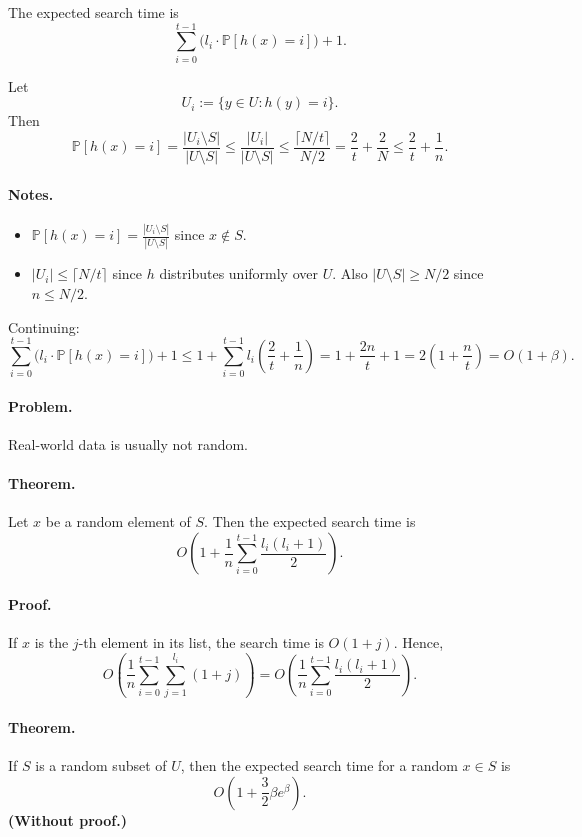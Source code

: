 \documentclass{article}
\begin{document}
The expected search time is
\[
\sum_{i=0}^{t-1} \big( l_i \cdot \mathbb{P}[h(x)=i] \big) + 1.
\]

Let
\[
U_i := \{y\in U : h(y)=i\}.
\]
Then
\[
\mathbb{P}[h(x)=i]
  = \frac{|U_i \setminus S|}{|U\setminus S|}
  \le \frac{|U_i|}{|U\setminus S|}
  \le \frac{\lceil N/t\rceil}{N/2}
  = \frac{2}{t} + \frac{2}{N}
  \le \frac{2}{t} + \frac{1}{n}.
\]

\paragraph{Notes.}
\begin{itemize}
    \item $\mathbb{P}[h(x)=i] = \frac{|U_i\setminus S|}{|U\setminus S|}$ since $x\notin S$.
    \item $|U_i| \le \lceil N/t\rceil$ since $h$ distributes uniformly over $U$.  
          Also $|U\setminus S| \ge N/2$ since $n \le N/2$.
\end{itemize}

Continuing:
\[
\sum_{i=0}^{t-1} \big( l_i \cdot \mathbb{P}[h(x)=i] \big) + 1
  \le 1 + \sum_{i=0}^{t-1} l_i\left(\frac{2}{t}+\frac{1}{n}\right)
  = 1 + \frac{2n}{t} + 1
  = 2\left(1+\frac{n}{t}\right)
  = O(1+\beta).
\]

\paragraph{Problem.}  
Real-world data is usually not random.

\paragraph{Theorem.}  
Let $x$ be a random element of $S$. Then the expected search time is
\[
O\left(1 + \frac{1}{n}\sum_{i=0}^{t-1} \frac{l_i(l_i+1)}{2}\right).
\]

\paragraph{Proof.}  
If $x$ is the $j$-th element in its list, the search time is $O(1+j)$.  
Hence,
\[
O\left(
\frac{1}{n}
  \sum_{i=0}^{t-1}\sum_{j=1}^{l_i}(1+j)
\right)
= O\left(
\frac{1}{n}
\sum_{i=0}^{t-1}\frac{l_i(l_i+1)}{2}
\right).
\]

\paragraph{Theorem.}  
If $S$ is a random subset of $U$, then the expected search time for a random $x\in S$ is  
\[
O\!\left(1+\frac{3}{2}\beta e^\beta\right).
\]
\textbf{(Without proof.)}
\end{document}
